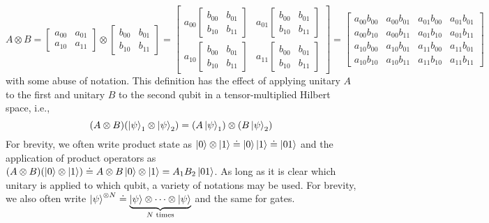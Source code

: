 		\begin{equation}
			A \otimes B
			= \begin{bmatrix} a_{00} & a_{01} \\ a_{10} & a_{11} \end{bmatrix} \otimes \begin{bmatrix} b_{00} & b_{01} \\ b_{10} & b_{11} \end{bmatrix}
			= \begin{bmatrix} a_{00} \begin{bmatrix} b_{00} & b_{01} \\ b_{10} & b_{11} \end{bmatrix} & a_{01} \begin{bmatrix} b_{00} & b_{01} \\ b_{10} & b_{11} \end{bmatrix} \\ a_{10} \begin{bmatrix} b_{00} & b_{01} \\ b_{10} & b_{11} \end{bmatrix} & a_{11} \begin{bmatrix} b_{00} & b_{01} \\ b_{10} & b_{11} \end{bmatrix} \end{bmatrix}
			=
			\begin{bmatrix}
				a_{00} b_{00} & a_{00} b_{01} & a_{01} b_{00} & a_{01} b_{01} \\
				a_{00} b_{10} & a_{00} b_{11} & a_{01} b_{10} & a_{01} b_{11} \\
				a_{10} b_{00} & a_{10} b_{01} & a_{11} b_{00} & a_{11} b_{01} \\
				a_{10} b_{10} & a_{10} b_{11} & a_{11} b_{10} & a_{11} b_{11}
			\end{bmatrix}
		\end{equation}
		with some abuse of notation. This definition has the effect of applying unitary \(A\) to the first and unitary \(B\) to the second qubit in a tensor-multiplied Hilbert space, i.e.,
		\begin{equation}
			(A \otimes B) (\ket{\psi}_1 \otimes \ket{\psi}_2) = (A \ket{\psi}_1) \otimes (B \ket{\psi}_2)
		\end{equation}
		For brevity, we often write product state as \( \ket{0} \otimes \ket{1} \doteq \ket{0} \ket{1} \doteq \ket{01} \) and the application of product operators as \( (A \otimes B) (\ket{0} \otimes \ket{1}) \doteq A \otimes B \ket{0} \otimes \ket{1} = A_1 B_2 \ket{01} \). As long as it is clear which unitary is applied to which qubit, a variety of notations may be used. For brevity, we also often write \( \ket{\psi}^{\otimes N} \doteq \underbrace{\ket{\psi} \otimes \dots \otimes \ket{\psi}}_{N\text{ times}} \) and the same for gates.

